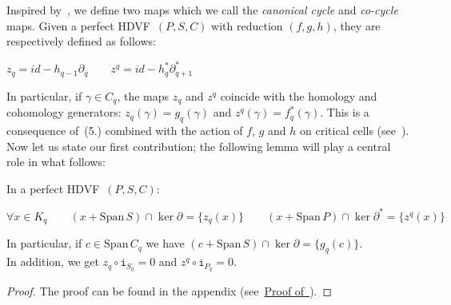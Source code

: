 \documentclass[runningheads]{llncs}
\newcommand{\proofref}[1]{\hyperlink{#1}{Proof of~\Cref{#1}}}
\newcommand\Span{\mathrm{Span}\,}
\newcommand{\dr}{\partial}
\newcommand{\inc}[2]{\mathtt{i}_{#1}}
\newcommand{\HC}{HDVF}
\newcommand\id{id}
\newcommand{\add}[1]{{#1}}%
\begin{document}
Inspired by~\cite{edelsbrunner-tri_partition}, we define two maps which we call the \textit{canonical cycle} and \textit{co-cycle} maps.
Given a perfect \HC\ $(P,S,C)$ with reduction $(f,g,h)$, they are respectively defined as follows:
\begin{center}
    $ z_q = \id - h_{q-1}\dr_{q} \qquad z^q = \id - h_{q}^\ast\dr_{q+1}^\ast $
\end{center}
In particular, if $\gamma\in C_q$, the maps $z_q$ and $z^q$ coincide with the homology and cohomology generators: $ z_q(\gamma) = g_q(\gamma)$ and $z^q(\gamma) = f_q^\ast(\gamma)$.
This is a consequence of~(5.) combined with the action of $f$, $g$ and $h$ on critical cells (see~).
\add{Now let us state our first contribution; the following lemma will play a central role in what follows:}
\begin{lemma}\label{lem_canonical-cycle}
In a perfect \HC\ $(P,S,C)$:
\begin{center}
    $\forall x\in K_q \qquad (x+\Span S)\cap\ker\dr = \{z_q(x)\} \qquad (x+\Span P)\cap\ker\dr^\ast = \{z^q(x)\}$
\end{center}
  In particular, if $c\in\Span C_q$ we have $(c+\Span S)\cap\ker\dr = \{g_q(c)\}$.\\%
  In addition, we get $z_q \circ \inc{S_q}{} = 0$ and $z^q \circ \inc{P_q}{} = 0$.
\end{lemma}
\begin{proof}
The proof can be found in the appendix (see~\proofref{lem_canonical-cycle}).
\end{proof}
\end{document}
